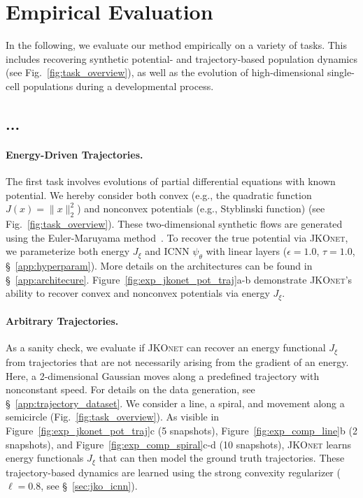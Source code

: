 \section{Empirical Evaluation} \label{sec:evaluation}
In the following, we evaluate our method empirically on a variety of tasks. This includes recovering synthetic potential- and trajectory-based population dynamics (see Fig.~\ref{fig:task_overview}), as well as the evolution of high-dimensional single-cell populations during a developmental process. 

\subsection{...} \label{sec:eval_synt}
\paragraph{Energy-Driven Trajectories.} The first task involves evolutions of partial differential equations with known potential. We hereby consider both convex (e.g., the quadratic function $J(x) = \|x\|^2_2$) and nonconvex potentials (e.g., Styblinski function) (see Fig.~\ref{fig:task_overview}). These two-dimensional synthetic flows are generated using the Euler-Maruyama method~\citep{kloeden1992stochastic}. 
To recover the true potential via \textsc{JKOnet}, we parameterize both energy $J_\xi$ and ICNN $\psi_\theta$ with linear layers ($\epsilon = 1.0$, $\tau = 1.0$, \S~\ref{app:hyperparam}). More details on the architectures can be found in \S~\ref{app:architecure}.
Figure~\ref{fig:exp_jkonet_pot_traj}a-b demonstrate \textsc{JKOnet}'s ability to recover convex and nonconvex potentials via energy $J_\xi$.

\paragraph{Arbitrary Trajectories.} As a sanity check, we evaluate if \textsc{JKOnet} can recover an energy functional $J_\xi$ from trajectories that are not necessarily arising from the gradient of an energy. Here, a 2-dimensional Gaussian moves along a predefined trajectory with nonconstant speed. 
For details on the data generation, see \S~\ref{app:trajectory_dataset}.
We consider a line, a spiral, and movement along a semicircle (Fig.~\ref{fig:task_overview}). As visible in Figure~\ref{fig:exp_jkonet_pot_traj}c (5 snapshots), Figure~\ref{fig:exp_comp_line}b (2 snapshots), and Figure~\ref{fig:exp_comp_spiral}c-d (10 snapshots), \textsc{JKOnet} learns energy functionals $J_\xi$ that can then model the ground truth trajectories.
These trajectory-based dynamics are learned using the strong convexity regularizer ($\ell=0.8$, see \S~\ref{sec:jko_icnn}).

